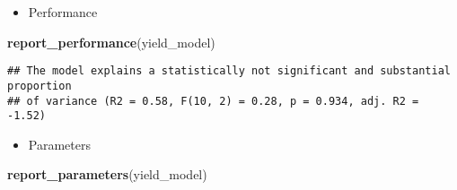 \documentclass[
]{article}
\newenvironment{Shaded}{\begin{snugshade}}{\end{snugshade}}
\newcommand{\FunctionTok}[1]{\textcolor[rgb]{0.13,0.29,0.53}{\textbf{#1}}}
\newcommand{\NormalTok}[1]{#1}
\providecommand{\tightlist}{%
  \setlength{\itemsep}{0pt}\setlength{\parskip}{0pt}}
\begin{document}
\begin{itemize}
\tightlist
\item
  Performance
\end{itemize}

\begin{Shaded}
\begin{Highlighting}[]
\FunctionTok{report\_performance}\NormalTok{(yield\_model)}
\end{Highlighting}
\end{Shaded}

\begin{verbatim}
## The model explains a statistically not significant and substantial proportion
## of variance (R2 = 0.58, F(10, 2) = 0.28, p = 0.934, adj. R2 = -1.52)
\end{verbatim}

\begin{itemize}
\tightlist
\item
  Parameters
\end{itemize}

\begin{Shaded}
\begin{Highlighting}[]
\FunctionTok{report\_parameters}\NormalTok{(yield\_model)}
\end{Highlighting}
\end{Shaded}
\end{document}
